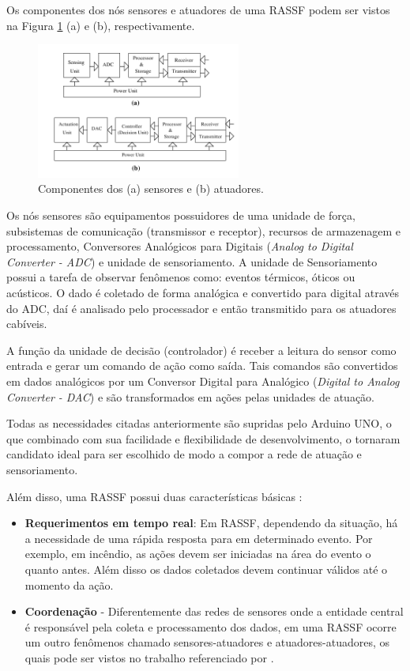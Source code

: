 \documentclass[12pt,a4paper,oneside]{report}
\begin{document}
Os componentes dos nós sensores e atuadores de uma RASSF podem ser vistos na Figura \ref{fig:componentes-atuador-sensor} (a) e (b), respectivamente.

\begin{figure}[htbp]
   \centering
    \includegraphics[width=0.6\textwidth]{figuras/figura_2_7}
    \caption{Componentes dos (a) sensores e (b) atuadores.}
    \label{fig:componentes-atuador-sensor}
\end{figure}

Os nós sensores são equipamentos possuidores de uma unidade de força, subsistemas de comunicação (transmissor e receptor), recursos de armazenagem e processamento, Conversores Analógicos para Digitais (\emph{Analog to Digital Converter - ADC}) e unidade de sensoriamento. A unidade de Sensoriamento possui a tarefa de observar fenômenos como: eventos térmicos, óticos ou acústicos. O dado é coletado de forma analógica e convertido para digital através do ADC, daí é analisado pelo processador e então transmitido para os atuadores cabíveis.

A função da unidade de decisão (controlador) é receber a leitura do sensor como entrada e gerar um comando de ação como saída. Tais comandos são convertidos em dados analógicos por um Conversor Digital para Analógico (\emph{Digital to Analog Converter - DAC}) e são transformados em ações pelas unidades de atuação.

Todas as necessidades citadas anteriormente são supridas pelo Arduino UNO, o que combinado com sua facilidade e flexibilidade de desenvolvimento, o tornaram candidato ideal para ser escolhido de modo a compor a rede de atuação e sensoriamento.

Além disso, uma RASSF possui duas características básicas \cite{wsaniais}:
\begin{itemize}
    \item \textbf{Requerimentos em tempo real}: Em RASSF, dependendo da situação, há a necessidade de uma rápida resposta para em determinado evento. Por exemplo, em incêndio, as ações devem ser iniciadas na área do evento o quanto antes. Além disso os dados coletados devem continuar válidos até o momento da ação.
    \item \textbf{Coordenação} - Diferentemente das redes de sensores onde a entidade central é responsável pela coleta e processamento dos dados, em  uma RASSF ocorre um outro fenômenos chamado sensores-atuadores e atuadores-atuadores, os quais pode ser vistos no trabalho referenciado por \cite{wsaniais}.
\end{itemize}
\end{document}
